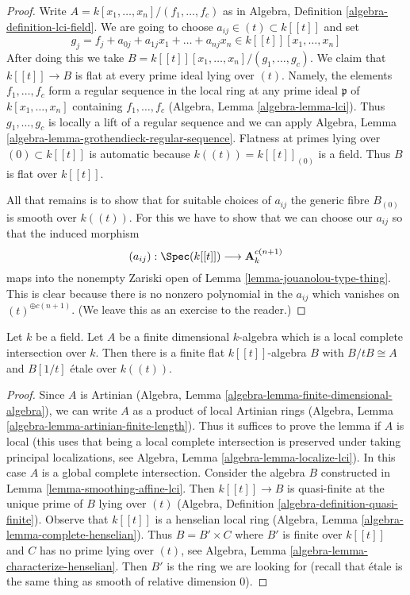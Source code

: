 \begin{proof}
Write $A = k[x_1, \ldots, x_n]/(f_1, \ldots, f_c)$ as in
Algebra, Definition \ref{algebra-definition-lci-field}.
We are going to choose
$a_{ij} \in (t) \subset k[[t]]$ and set
$$
g_j = f_j + a_{0j} + a_{1j}x_1 + \ldots + a_{nj}x_n \in
k[[t]][x_1, \ldots, x_n]
$$
After doing this we take
$B = k[[t]][x_1, \ldots, x_n]/(g_1, \ldots, g_c)$.
We claim that $k[[t]] \to B$ is flat at every prime ideal
lying over $(t)$. Namely, the elements $f_1, \ldots, f_c$
form a regular sequence in the local ring at any prime ideal
$\mathfrak p$ of $k[x_1, \ldots, x_n]$ containing $f_1, \ldots, f_c$
(Algebra, Lemma \ref{algebra-lemma-lci}). Thus $g_1, \ldots, g_c$
is locally a lift of a regular sequence and we can apply
Algebra, Lemma \ref{algebra-lemma-grothendieck-regular-sequence}.
Flatness at primes lying over $(0) \subset k[[t]]$ is automatic
because $k((t)) = k[[t]]_{(0)}$ is a field. Thus $B$ is flat
over $k[[t]]$.

\medskip\noindent
All that remains is to show that for suitable choices
of $a_{ij}$ the generic fibre $B_{(0)}$ is smooth over
$k((t))$. For this we have to show that we can choose
our $a_{ij}$ so that the induced morphism
$$
(a_{ij}) : \Spec(k[[t]]) \longrightarrow \mathbf{A}^{c(n + 1)}_k
$$
maps into the nonempty Zariski open of
Lemma \ref{lemma-jouanolou-type-thing}.
This is clear because there is no nonzero polynomial in the
$a_{ij}$ which vanishes on $(t)^{\oplus c(n + 1)}$.
(We leave this as an exercise to the reader.)
\end{proof}

\begin{lemma}
\label{lemma-smoothing-artinian-lci}
Let $k$ be a field. Let $A$ be a finite dimensional $k$-algebra
which is a local complete intersection over $k$. Then there is
a finite flat $k[[t]]$-algebra $B$ with $B/tB \cong A$
and $B[1/t]$ \'etale over $k((t))$.
\end{lemma}

\begin{proof}
Since $A$ is Artinian
(Algebra, Lemma \ref{algebra-lemma-finite-dimensional-algebra}),
we can write $A$ as a product of local Artinian rings
(Algebra, Lemma \ref{algebra-lemma-artinian-finite-length}).
Thus it suffices to prove the lemma if $A$ is local
(this uses that being a local complete intersection is
preserved under taking principal localizations, see
Algebra, Lemma \ref{algebra-lemma-localize-lci}).
In this case $A$ is a global complete intersection.
Consider the algebra $B$ constructed in
Lemma \ref{lemma-smoothing-affine-lci}.
Then $k[[t]] \to B$ is quasi-finite at the unique prime of $B$
lying over $(t)$ (Algebra, Definition \ref{algebra-definition-quasi-finite}).
Observe that $k[[t]]$ is a henselian local ring
(Algebra, Lemma \ref{algebra-lemma-complete-henselian}).
Thus $B = B' \times C$ where $B'$ is finite over $k[[t]]$
and $C$ has no prime lying over $(t)$, see
Algebra, Lemma \ref{algebra-lemma-characterize-henselian}.
Then $B'$ is the ring we are looking for
(recall that \'etale is the same thing as
smooth of relative dimension $0$).
\end{proof}

